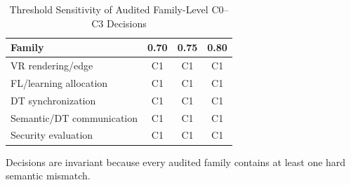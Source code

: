 \begin{table}[H]\centering\caption{Threshold Sensitivity of Audited Family-Level C0--C3 Decisions}\label{tab:thresholdsens}\scriptsize\begin{tabularx}{\columnwidth}{Yccc}\toprule Family&0.70&0.75&0.80\\\midrule VR rendering/edge&C1&C1&C1\\ FL/learning allocation&C1&C1&C1\\ DT synchronization&C1&C1&C1\\ Semantic/DT communication&C1&C1&C1\\ Security evaluation&C1&C1&C1\\\bottomrule\end{tabularx}\vspace{1mm}\par\raggedright\scriptsize Decisions are invariant because every audited family contains at least one hard semantic mismatch.\end{table}